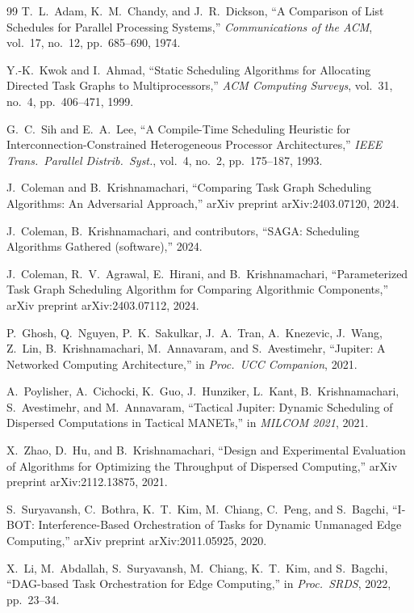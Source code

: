 \documentclass[conference]{IEEEtran}
\begin{document}
\begin{thebibliography}{99}
T.~L.~Adam, K.~M.~Chandy, and J.~R.~Dickson,
``A Comparison of List Schedules for Parallel Processing Systems,''
\emph{Communications of the ACM},
vol.~17, no.~12, pp.~685--690, 1974.

Y.-K.~Kwok and I.~Ahmad,
``Static Scheduling Algorithms for Allocating Directed Task Graphs to
Multiprocessors,''
\emph{ACM Computing Surveys},
vol.~31, no.~4, pp.~406--471, 1999.

G.~C.~Sih and E.~A.~Lee,
``A Compile-Time Scheduling Heuristic for Interconnection-Constrained
Heterogeneous Processor Architectures,''
\emph{IEEE Trans.\ Parallel Distrib.\ Syst.},
vol.~4, no.~2, pp.~175--187, 1993.

J.~Coleman and B.~Krishnamachari,
``Comparing Task Graph Scheduling Algorithms: An Adversarial Approach,''
arXiv preprint arXiv:2403.07120, 2024.

J.~Coleman, B.~Krishnamachari, and contributors,
``{SAGA}: Scheduling Algorithms Gathered (software),'' 2024.

J.~Coleman, R.~V.~Agrawal, E.~Hirani, and B.~Krishnamachari,
``Parameterized Task Graph Scheduling Algorithm for Comparing Algorithmic
Components,''
arXiv preprint arXiv:2403.07112, 2024.

P.~Ghosh, Q.~Nguyen, P.~K.~Sakulkar, J.~A.~Tran, A.~Knezevic, J.~Wang,
Z.~Lin, B.~Krishnamachari, M.~Annavaram, and S.~Avestimehr,
``Jupiter: A Networked Computing Architecture,''
in \emph{Proc.\ UCC Companion}, 2021.

A.~Poylisher, A.~Cichocki, K.~Guo, J.~Hunziker, L.~Kant,
B.~Krishnamachari, S.~Avestimehr, and M.~Annavaram,
``Tactical Jupiter: Dynamic Scheduling of Dispersed Computations in
Tactical MANETs,''
in \emph{MILCOM 2021}, 2021.

X.~Zhao, D.~Hu, and B.~Krishnamachari,
``Design and Experimental Evaluation of Algorithms for Optimizing the
Throughput of Dispersed Computing,''
arXiv preprint arXiv:2112.13875, 2021.

S.~Suryavansh, C.~Bothra, K.~T.~Kim, M.~Chiang, C.~Peng, and S.~Bagchi,
``{I-BOT}: Interference-Based Orchestration of Tasks for Dynamic Unmanaged
Edge Computing,''
arXiv preprint arXiv:2011.05925, 2020.

X.~Li, M.~Abdallah, S.~Suryavansh, M.~Chiang, K.~T.~Kim, and S.~Bagchi,
``DAG-based Task Orchestration for Edge Computing,''
in \emph{Proc.\ SRDS}, 2022, pp.~23--34.


\end{thebibliography}
\end{document}
